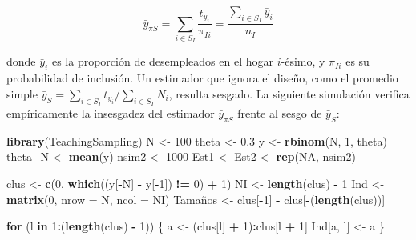 \documentclass[
  spanish,
  12pt,
]{book}
\newenvironment{Shaded}{\begin{snugshade}}{\end{snugshade}}
\newcommand{\AttributeTok}[1]{\textcolor[rgb]{0.13,0.29,0.53}{#1}}
\newcommand{\ConstantTok}[1]{\textcolor[rgb]{0.56,0.35,0.01}{#1}}
\newcommand{\ControlFlowTok}[1]{\textcolor[rgb]{0.13,0.29,0.53}{\textbf{#1}}}
\newcommand{\DecValTok}[1]{\textcolor[rgb]{0.00,0.00,0.81}{#1}}
\newcommand{\FloatTok}[1]{\textcolor[rgb]{0.00,0.00,0.81}{#1}}
\newcommand{\FunctionTok}[1]{\textcolor[rgb]{0.13,0.29,0.53}{\textbf{#1}}}
\newcommand{\NormalTok}[1]{#1}
\newcommand{\OtherTok}[1]{\textcolor[rgb]{0.56,0.35,0.01}{#1}}
\newcommand{\SpecialCharTok}[1]{\textcolor[rgb]{0.81,0.36,0.00}{\textbf{#1}}}
\begin{document}
\[
\bar{y}_{\pi S} = \sum_{i \in S_I} \frac{t_{y_i}}{\pi_{Ii}} = \frac{\sum_{i \in S_I} \bar{y}_i}{n_I}
\]

donde \(\bar{y}_i\) es la proporción de desempleados en el hogar \(i\)-ésimo, y \(\pi_{Ii}\) es su probabilidad de inclusión. Un estimador que ignora el diseño, como el promedio simple \(\bar{y}_S = \sum_{i \in S_I} t_{y_i} / \sum_{i \in S_I} N_i\), resulta sesgado. La siguiente simulación verifica empíricamente la insesgadez del estimador \(\bar{y}_{\pi S}\) frente al sesgo de \(\bar{y}_S\):

\begin{Shaded}
\begin{Highlighting}[]
\FunctionTok{library}\NormalTok{(TeachingSampling)}
\NormalTok{N      }\OtherTok{\textless{}{-}} \DecValTok{100}
\NormalTok{theta  }\OtherTok{\textless{}{-}} \FloatTok{0.3}
\NormalTok{y      }\OtherTok{\textless{}{-}} \FunctionTok{rbinom}\NormalTok{(N, }\DecValTok{1}\NormalTok{, theta)}
\NormalTok{theta\_N }\OtherTok{\textless{}{-}} \FunctionTok{mean}\NormalTok{(y)}
\NormalTok{nsim2  }\OtherTok{\textless{}{-}} \DecValTok{1000}
\NormalTok{Est1 }\OtherTok{\textless{}{-}}\NormalTok{ Est2 }\OtherTok{\textless{}{-}} \FunctionTok{rep}\NormalTok{(}\ConstantTok{NA}\NormalTok{, nsim2)}

\NormalTok{clus    }\OtherTok{\textless{}{-}} \FunctionTok{c}\NormalTok{(}\DecValTok{0}\NormalTok{, }\FunctionTok{which}\NormalTok{((y[}\SpecialCharTok{{-}}\NormalTok{N] }\SpecialCharTok{{-}}\NormalTok{ y[}\SpecialCharTok{{-}}\DecValTok{1}\NormalTok{]) }\SpecialCharTok{!=} \DecValTok{0}\NormalTok{) }\SpecialCharTok{+} \DecValTok{1}\NormalTok{)}
\NormalTok{NI      }\OtherTok{\textless{}{-}} \FunctionTok{length}\NormalTok{(clus) }\SpecialCharTok{{-}} \DecValTok{1}
\NormalTok{Ind     }\OtherTok{\textless{}{-}} \FunctionTok{matrix}\NormalTok{(}\DecValTok{0}\NormalTok{, }\AttributeTok{nrow =}\NormalTok{ N, }\AttributeTok{ncol =}\NormalTok{ NI)}
\NormalTok{Tamaños }\OtherTok{\textless{}{-}}\NormalTok{ clus[}\SpecialCharTok{{-}}\DecValTok{1}\NormalTok{] }\SpecialCharTok{{-}}\NormalTok{ clus[}\SpecialCharTok{{-}}\NormalTok{(}\FunctionTok{length}\NormalTok{(clus))]}

\ControlFlowTok{for}\NormalTok{ (l }\ControlFlowTok{in} \DecValTok{1}\SpecialCharTok{:}\NormalTok{(}\FunctionTok{length}\NormalTok{(clus) }\SpecialCharTok{{-}} \DecValTok{1}\NormalTok{)) \{}
\NormalTok{  a }\OtherTok{\textless{}{-}}\NormalTok{ (clus[l] }\SpecialCharTok{+} \DecValTok{1}\NormalTok{)}\SpecialCharTok{:}\NormalTok{clus[l }\SpecialCharTok{+} \DecValTok{1}\NormalTok{]}
\NormalTok{  Ind[a, l] }\OtherTok{\textless{}{-}}\NormalTok{ a}
\NormalTok{\}}


\end{Highlighting}
\end{Shaded}
\end{document}
